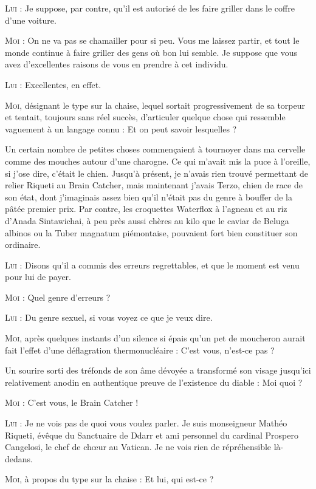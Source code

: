 \textsc{Lui} : Je suppose, par contre, qu’il est autorisé de les faire griller dans le coffre d’une voiture.

\textsc{Moi} : On ne va pas se chamailler pour si peu. Vous me laissez partir, et tout le monde continue à faire griller des gens où bon lui semble. Je suppose que vous avez d’excellentes raisons de vous en prendre à cet individu.

\textsc{Lui} : Excellentes, en effet.

\textsc{Moi}, désignant le type sur la chaise, lequel sortait progressivement de sa torpeur et tentait, toujours sans réel succès, d’articuler quelque chose qui ressemble vaguement à un langage connu : Et on peut savoir lesquelles ?

Un certain nombre de petites choses commençaient à tournoyer dans ma cervelle comme des mouches autour d’une charogne. Ce qui m’avait mis la puce à l’oreille, si j’ose dire, c’était le chien. Jusqu’à présent, je n’avais rien trouvé permettant de relier Riqueti au Brain Catcher, mais maintenant j’avais Terzo, chien de race de son état, dont j’imaginais assez bien qu’il n’était pas du genre à bouffer de la pâtée premier prix. Par contre, les croquettes Waterflox à l’agneau et au riz d’Anada Sintawichai, à peu près aussi chères au kilo que le caviar de Beluga albinos ou la Tuber magnatum piémontaise, pouvaient fort bien constituer son ordinaire.

\textsc{Lui} : Disons qu’il a commis des erreurs regrettables, et que le moment est venu pour lui de payer.

\textsc{Moi} : Quel genre d’erreurs ?

\textsc{Lui} : Du genre sexuel, si vous voyez ce que je veux dire.

\textsc{Moi}, après quelques instants d’un silence si épais qu’un pet de moucheron aurait fait l’effet d’une déflagration thermonucléaire : C’est vous, n’est-ce pas ?

Un sourire sorti des tréfonds de son âme dévoyée a transformé son visage jusqu’ici relativement anodin en authentique preuve de l’existence du diable : Moi quoi ?

\textsc{Moi} : C’est vous, le Brain Catcher !

\textsc{Lui} : Je ne vois pas de quoi vous voulez parler. Je suis monseigneur Mathéo Riqueti, évêque du Sanctuaire de Ddarr et ami personnel du cardinal Prospero Cangelosi, le chef de chœur au Vatican. Je ne vois rien de répréhensible là-dedans.

\textsc{Moi}, à propos du type sur la chaise : Et lui, qui est-ce ?

